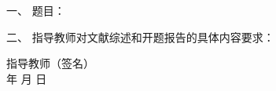 \newpage

\thispagestyle{empty}

{
\setlength{\parindent}{0em}
\renewcommand{\baselinestretch}{2}
\songti\sihao\bfseries

一、 \; 题目： \; \underline{\makebox[24em]{\zjutitlec}}

\vspace{2em}

二、 \; 指导教师对文献综述和开题报告的具体内容要求：


\vspace{16cm}
}

{
\songti\xiaosi\bfseries
\begin{flushright}
  指导教师（签名） \; \underline{\hspace{6em}} \\
  年 \qquad 月 \qquad 日
\end{flushright}
}

